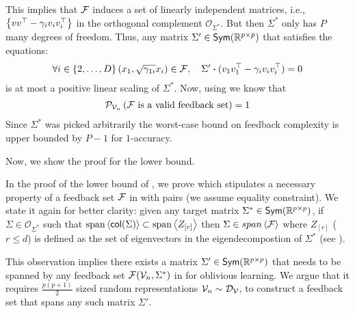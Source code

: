 This implies that ${\mathcal{F}}$ induces a set of linearly independent matrices, i.e., $\left\{vv^{\top} - \gamma_{i}v_iv_i^{\top}\right\}$ in the orthogonal complement $\mathcal{O}_{\Sigma^*}$. But then $\Sigma^*$ only has $P$ many degrees of freedom. Thus, any matrix $\Sigma' \in \textsf{Sym}(\mathbb{R}^{p\times p})$ that satisfies the equations:
\begin{align*}
    \forall i \in \left\{2,\ldots, D\right\} (x_1, \sqrt{\gamma_{1i}}x_i) \in {\mathcal{F}},\quad \Sigma' \boldsymbol{\cdot} (v_1v_1^{\top} - \gamma_{i}v_iv_i^{\top}) = 0
\end{align*}
is at most a positive linear scaling of $\Sigma^*$. Now, using  we know that
\begin{align*}
    {\mathcal{P}}_{{\mathcal{V}}_n} \left( { {\mathcal{F}} \textnormal{ is a valid feedback set}} \right)  = 1
\end{align*}
Since $\Sigma^*$ was picked arbitrarily the worst-case bound on feedback complexity is upper bounded by $ P - 1$ for $1$-accuracy.

Now, we show the proof for the lower bound.

In the proof of the lower bound of , we prove  which stipulates a necessary property of a feedback set ${\mathcal{F}}$ in  with pairs (we assume equality constraint). We state it again for better clarity: given any target matrix $\Sigma^* \in \textsf{Sym}(\mathbb{R}^{p\times p})$, if $\Sigma \in \mathcal{O}_{\Sigma^*}$ such that $\text{span}\left<\textsf{col}({\Sigma})\right> \subset \text{span} \left<Z_{\left[r\right]}\right>$ then $\Sigma \in span \left<{\mathcal{F}}\right>$ where $Z_{[r]}$ ($r \le d$) is defined as the set of eigenvectors in the eigendecompostion of $\Sigma^*$ (see ). 
    
This observation implies there exists a matrix $\Sigma' \in \textsf{Sym}(\mathbb{R}^{p\times p})$ that needs to be spanned by any feedback set ${\mathcal{F}}({\mathcal{V}}_n, {\Sigma^*})$ in  for oblivious learning. We argue that it requires $\frac{p(p+1)}{2}$ sized random representations ${\mathcal{V}}_n \sim {\mathcal{D}}_{{\mathcal{V}}}$, to construct a feedback set that spans any such matrix $\Sigma'$.

